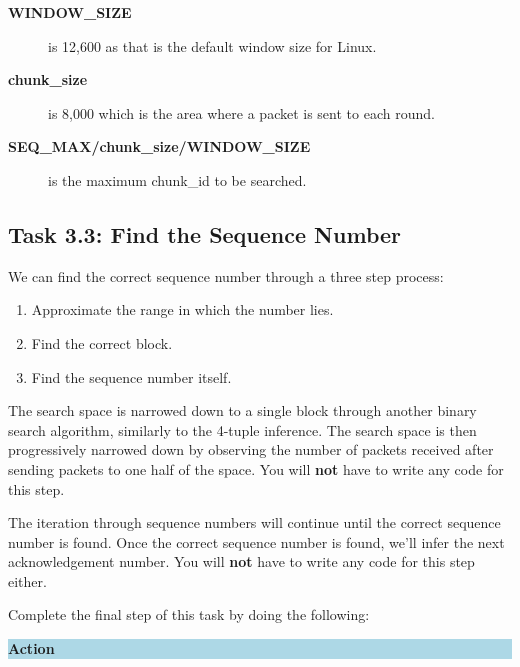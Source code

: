 \documentclass[letterpaper,12pt]{report}
\begin{document}
\begin{sloppypar}
\begin{description}
    \item[\textbf{WINDOW\_SIZE}] \begin{sloppypar}is 12,600 as that is the default window size for Linux.\end{sloppypar}

    \item[\textbf{chunk\_size}] \begin{sloppypar}is 8,000 which is the area where a packet is sent to each round.\end{sloppypar}

    \item[\textbf{SEQ\_MAX/chunk\_size/WINDOW\_SIZE}] \begin{sloppypar} is the maximum chunk\_id to be searched.\end{sloppypar}
\end{description}

\subsection*{Task 3.3: Find the Sequence Number}\label{sec:Task-3.3-Find-the-Sequence-Number}

We can find the correct sequence number through a three step process:

\begin{enumerate}
    \item Approximate the range in which the number lies.
    \item Find the correct block.
    \item Find the sequence number itself.
\end{enumerate}

The search space is narrowed down to a single block through another binary search algorithm, similarly to the 4-tuple inference. The search space is then progressively narrowed down by observing the number of packets received after sending packets to one half of the space. You will \textbf{not} have to write any code for this step.

The iteration through sequence numbers will continue until the correct sequence number is found. Once the correct sequence number is found, we'll infer the next acknowledgement number. You will \textbf{not} have to write any code for this step either.

Complete the final step of this task by doing the following:

\colorbox{lightblue}{%
\parbox{\dimexpr\linewidth-2\fboxsep}{%
\textbf{Action}

}}
\end{sloppypar}
\end{document}
